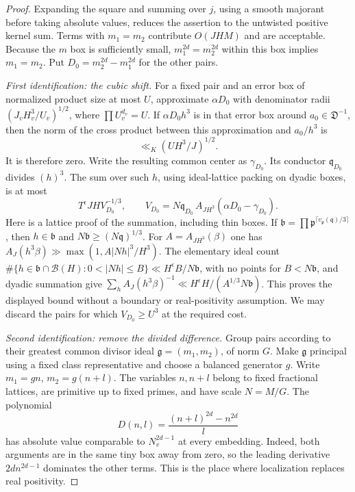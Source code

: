 \documentclass[11pt,reqno]{amsart}
\numberwithin{equation}{section}
\theoremstyle{definition}
\begin{document}
\begin{proof}
Expanding the square and summing over $j$, using a smooth majorant before
taking absolute values, reduces the assertion to the untwisted positive
kernel sum.  Terms with $m_1=m_2$ contribute $O(JHM)$ and are acceptable.
Because the $m$ box is sufficiently small, $m_1^{2d}=m_2^{2d}$ within this
box implies $m_1=m_2$.  Put $D_0=m_2^{2d}-m_1^{2d}$ for the other pairs.

\emph{First identification: the cubic shift.}
For a fixed pair and an error box of normalized product size at most $U$,
approximate $\alpha D_0$ with denominator radii
$(J_vH_v^3/U_v)^{1/2}$, where $\prod U_v^{d_v}=U$.
If $\alpha D_0h^3$ is in that error box around $a_0\in\mathfrak D^{-1}$,
then the norm of the cross product between this approximation and $a_0/h^3$
is
\[
 \ll_K (UH^3/J)^{1/2}.
\]
It is therefore zero.  Write the resulting common center as $\gamma_{D_0}$.
Its conductor $\mathfrak q_{D_0}$ divides $(h)^3$.
The sum over such $h$, using ideal-lattice packing on dyadic boxes, is at most
\[
 T^\epsilon JH V_{D_0}^{-1/3},\qquad
 V_{D_0}=N\mathfrak q_{D_0}\,
 A_{JH^3}(\alpha D_0-\gamma_{D_0}).
\]
Here is a lattice proof of the summation, including thin boxes.  If
$\mathfrak b=\prod\mathfrak p^{\lceil v_\mathfrak p(\mathfrak q)/3\rceil}$,
then $h\in\mathfrak b$ and $N\mathfrak b\ge(N\mathfrak q)^{1/3}$.
For $A=A_{JH^3}(\beta)$ one has
$A_J(h^3\beta)\gg\max(1,A|Nh|^3/H^3)$.
The elementary ideal count
$\#\{h\in\mathfrak b\cap\mathcal B(H):0<|Nh|\le B\}
\ll H^\epsilon B/N\mathfrak b$, with no points for $B<N\mathfrak b$,
and dyadic summation give
$\sum_h A_J(h^3\beta)^{-1}\ll H^\epsilon H/(A^{1/3}N\mathfrak b)$.
This proves the displayed bound without a boundary or real-positivity assumption.
We may discard the pairs for which $V_{D_0}\ge U^3$ at the required cost.

\emph{Second identification: remove the divided difference.}
Group pairs according to their greatest common divisor ideal
$\mathfrak g=(m_1,m_2)$, of norm $G$.  Make $\mathfrak g$ principal using a
fixed class representative and choose a balanced generator $g$.
Write $m_1=gn$, $m_2=g(n+l)$.  The variables $n,n+l$ belong to fixed fractional
lattices, are primitive up to fixed primes, and have scale $N=M/G$.
The polynomial
\[
 D(n,l)=\frac{(n+l)^{2d}-n^{2d}}{l}
\]
has absolute value comparable to $N_v^{2d-1}$ at every embedding.
Indeed, both arguments are in the same tiny box away from zero, so the
leading derivative $2d n^{2d-1}$ dominates the other terms.
This is the place where localization replaces real positivity.


\end{proof}
\end{document}
